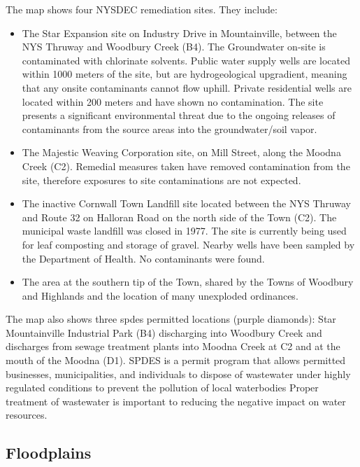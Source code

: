 The map shows four NYSDEC remediation sites. They include:
\begin{itemize}
    \item The Star Expansion site on Industry Drive in Mountainville, between 
    the NYS Thruway and Woodbury Creek (B4). The Groundwater on-site is 
    contaminated with chlorinate solvents. Public water supply wells are 
    located within 1000 meters of the site, but are hydrogeological 
    upgradient, meaning that any onsite contaminants cannot flow 
    uphill. Private residential wells are located within 200 meters 
    and have shown no contamination. The site presents a significant 
    environmental threat due to the ongoing releases of contaminants from the 
    source areas into the groundwater/soil vapor.
    \item The Majestic Weaving Corporation site, on Mill Street, along the 
    Moodna Creek (C2). Remedial measures taken have removed contamination from 
    the site, therefore exposures to site contaminations are not expected.
    \item The inactive Cornwall Town Landfill site located between the NYS 
    Thruway and Route 32 on Halloran Road on the north side of the Town (C2). 
    The municipal waste landfill was closed in 1977. The site is currently 
    being used for leaf composting and storage of gravel. Nearby wells have 
    been sampled by the Department of Health. No contaminants were found.
    \item The area at the southern tip of the Town, shared by the Towns of 
    Woodbury and Highlands and the location of many unexploded ordinances.
\end{itemize}
The map also shows three \gls{spdes} permitted 
locations (purple diamonds): Star Mountainville Industrial Park (B4) 
discharging into Woodbury Creek and discharges from sewage treatment plants into 
Moodna Creek at C2 and at the mouth of the Moodna (D1). SPDES is a permit 
program that allows permitted businesses, municipalities, and individuals to 
dispose of wastewater under highly regulated conditions to prevent the pollution 
of local waterbodies Proper treatment of wastewater is important to reducing the 
negative impact on water resources.

\subsection{Floodplains}\label{subsec:floodzones}

